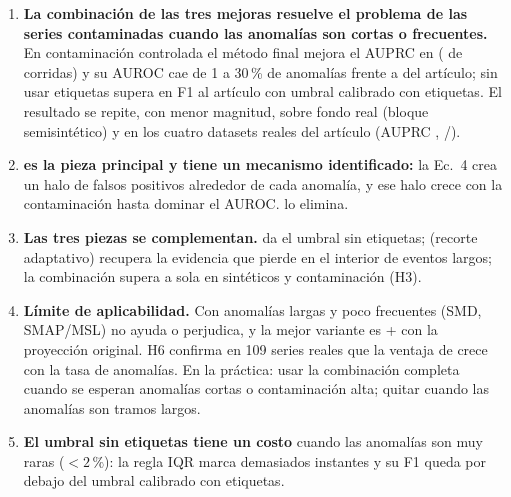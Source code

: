 \begin{enumerate}
\item \textbf{La combinación de las tres mejoras resuelve el problema de las series contaminadas cuando las
anomalías son cortas o frecuentes.} En contaminación controlada el método final mejora el AUPRC en
 ( de  corridas) y su AUROC cae
 de 1 a 30\,\% de anomalías frente a  del artículo; sin usar
etiquetas supera en F1 al artículo con umbral calibrado con etiquetas. El resultado se repite, con menor
magnitud, sobre fondo real (bloque semisintético) y en los cuatro datasets reales del artículo
(AUPRC , /).
\item \textbf{\MIII{} es la pieza principal y tiene un mecanismo identificado:} la Ec.~4 crea un halo de
falsos positivos alrededor de cada anomalía, y ese halo crece con la contaminación hasta dominar el AUROC.
\MIII{} lo elimina.
\item \textbf{Las tres piezas se complementan.} \MI{} da el umbral sin etiquetas; \MII{} (recorte adaptativo)
recupera la evidencia que \MIII{} pierde en el interior de eventos largos; la combinación supera a \MIII{}
sola en sintéticos y contaminación (H3).
\item \textbf{Límite de aplicabilidad.} Con anomalías largas y poco frecuentes (SMD, SMAP/MSL) \MIII{} no
ayuda o perjudica, y la mejor variante es \MI+\MII{} con la proyección original. H6 confirma en 109 series
reales que la ventaja de \MIII{} crece con la tasa de anomalías. En la práctica: usar la combinación
completa cuando se esperan anomalías cortas o contaminación alta; quitar \MIII{} cuando las anomalías son
tramos largos.
\item \textbf{El umbral sin etiquetas tiene un costo} cuando las anomalías son muy raras ($<2\,\%$): la regla
IQR marca demasiados instantes y su F1 queda por debajo del umbral calibrado con etiquetas.
\end{enumerate}
